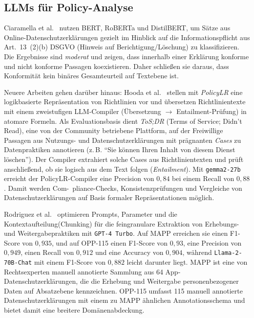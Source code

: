 \subsection*{\acp{LLM} für Policy-Analyse}

Ciaramella et al.\ \cite{ciaramella2022leveraging} nutzen BERT, RoBERTa und DistilBERT, um Sätze aus Online-Datenschutzerklärungen gezielt im Hinblick auf die Informationspflicht aus Art.\linebreak~13~(2)(b) \ac{DSGVO} (Hinweis auf Berichtigung/Löschung) zu klassifizieren. Die Ergebnisse sind \emph{moderat} und zeigen, dass innerhalb einer Erklärung konforme und nicht konforme Passagen koexistieren. Daher schließen sie daraus, dass Konformität kein binäres Gesamteurteil auf Textebene ist.

Neuere Arbeiten gehen darüber hinaus: Hooda et al.\ \cite{hooda2024policylr} stellen mit \emph{PolicyLR} eine logikbasierte Repräsentation von Richtlinien vor und übersetzen Richtlinientexte mit einem zweistufigen \ac{LLM}-Compiler (Übersetzung $\to$ Entailment-Prüfung) in atomare Formeln. Als Evaluationsbasis dient \emph{ToS;DR} (Terms of Service; Didn’t Read), eine von der Community betriebene Plattform, auf der Freiwillige Passagen aus Nutzungs- und Datenschutzerklärungen mit prägnanten \emph{Cases} zu Datenpraktiken annotieren (z.\,B. \enquote{Sie können Ihren Inhalt von diesem Dienst löschen}). Der Compiler extrahiert solche Cases aus Richtlinientexten und prüft anschließend, ob sie logisch aus dem Text folgen (\emph{Entailment}). Mit \texttt{gemma2-27b} erreicht der PolicyLR-Compiler eine Precision von $0{,}84$ bei einem Recall von $0{,}88$. Damit werden Com-\linebreak~pliance-Checks, Konsistenzprüfungen und Vergleiche von Datenschutzerklärungen auf Basis formaler Repräsentationen möglich.

Rodriguez et al.\ \cite{rodriguez2024largelanguagemodels} optimieren Prompts, Parameter und die Kontextaufteilung\linebreak(Chunking) für die feingranulare Extraktion von Erhebungs- und Weitergabepraktiken mit \texttt{GPT-4~Turbo}. Auf MAPP erreichen sie einen F1-Score von $0{,}935$, und auf OPP-115 einen F1-Score von $0{,}93$, eine Precision von $0{,}949$, einen Recall von $0{,}912$ und eine Accuracy von $0{,}904$, während \texttt{Llama-2-70B-Chat} mit einem F1-Score von $0{,}882$ leicht darunter liegt. MAPP ist eine von Rechtsexperten manuell annotierte Sammlung aus 64 App-Datenschutzerklärungen, die die Erhebung und Weitergabe personenbezogener Daten auf Absatzebene kennzeichnen. OPP-115 umfasst 115 manuell annotierte Datenschutzerklärungen mit einem zu MAPP ähnlichen Annotationsschema und bietet damit eine breitere Domänenabdeckung.


